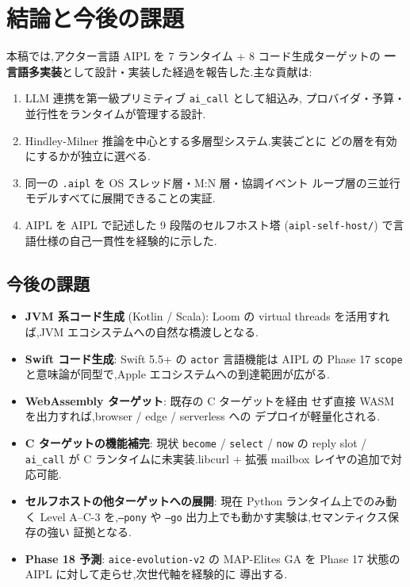 \documentclass[11pt,a4paper]{article}
\newcommand{\code}[1]{\texttt{\small #1}}
\begin{document}
\section{結論と今後の課題}
\label{sec:conc}

本稿では,アクター言語 AIPL を 7 ランタイム + 8 コード生成ターゲットの
\textbf{一言語多実装}として設計・実装した経過を報告した.主な貢献は:

\begin{enumerate}[leftmargin=*]
  \item LLM 連携を第一級プリミティブ \code{ai\_call} として組込み,
    プロバイダ・予算・並行性をランタイムが管理する設計.
  \item Hindley-Milner 推論を中心とする多層型システム.実装ごとに
    どの層を有効にするかが独立に選べる.
  \item 同一の \code{.aipl} を OS スレッド層・M:N 層・協調イベント
    ループ層の三並行モデルすべてに展開できることの実証.
  \item AIPL を AIPL で記述した 9 段階のセルフホスト塔
    (\code{aipl-self-host/}) で言語仕様の自己一貫性を経験的に示した.
\end{enumerate}

\subsection*{今後の課題}

\begin{itemize}[leftmargin=*]
  \item \textbf{JVM 系コード生成} (Kotlin / Scala): Loom の virtual threads
    を活用すれば,JVM エコシステムへの自然な橋渡しとなる.
  \item \textbf{Swift コード生成}: Swift 5.5+ の \code{actor} 言語機能は
    AIPL の Phase 17 \code{scope} と意味論が同型で,Apple
    エコシステムへの到達範囲が広がる.
  \item \textbf{WebAssembly ターゲット}: 既存の C ターゲットを経由
    せず直接 WASM を出力すれば,browser / edge / serverless への
    デプロイが軽量化される.
  \item \textbf{C ターゲットの機能補完}: 現状 \code{become} /
    \code{select} / \code{now} の reply slot / \code{ai\_call} が C
    ランタイムに未実装.libcurl + 拡張 mailbox レイヤの追加で対応可能.
  \item \textbf{セルフホストの他ターゲットへの展開}: 現在 Python
    ランタイム上でのみ動く Level A--C-3 を,\code{--pony} や
    \code{--go} 出力上でも動かす実験は,セマンティクス保存の強い
    証拠となる.
  \item \textbf{Phase 18 予測}: \code{aice-evolution-v2} の MAP-Elites
    GA を Phase 17 状態の AIPL に対して走らせ,次世代軸を経験的に
    導出する.
\end{itemize}
\end{document}
